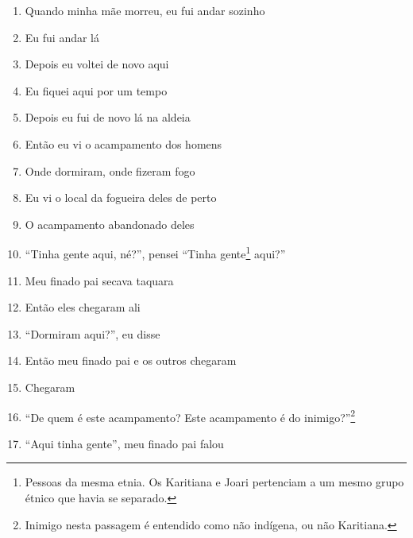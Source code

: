 \begin{enumerate}
 \item Quando minha mãe morreu, eu fui andar sozinho

 \item Eu fui andar lá

 \item Depois eu voltei de novo aqui

 \item Eu fiquei aqui por um tempo

 \begin{center}\end{center}

 \item Depois eu fui de novo lá na aldeia

 \item Então eu vi o acampamento dos homens

 \item Onde dormiram, onde fizeram fogo

 \item Eu vi o local da fogueira deles de perto

 \item O acampamento abandonado deles

 \item ``Tinha gente aqui, né?'', pensei ``Tinha gente\footnote{Pessoas da
   mesma etnia.  Os Karitiana e Joari pertenciam a um mesmo grupo étnico
   que havia se separado.} aqui?''

 \begin{center}\end{center}

 \item Meu finado pai secava taquara

 \item Então eles chegaram ali

 \item ``Dormiram aqui?'', eu disse

 \item Então meu finado pai e os outros chegaram

 \item Chegaram

 \item ``De quem é este acampamento? Este acampamento é do inimigo?''\footnote{Inimigo
   nesta passagem é entendido como não indígena, ou não Karitiana.}

 \item ``Aqui tinha gente'', meu finado pai falou


\end{enumerate}
